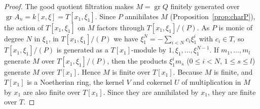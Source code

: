 \documentclass[pdflatex,sn-mathphys-num]{sn-jnl}
\numberwithin{equation}{section}
\theoremstyle{thmstyleone}
\theoremstyle{thmstyletwo}
\begin{document}
\begin{proof}
The good quotient filtration makes $M = \operatorname{gr} Q$ finitely generated over $\operatorname{gr} A_n = k[x,\xi] = T[{x_1}, \xi_1]$.
Since $P$ annihilates $M$ (Proposition~\ref{prop:charP}), the action of
$T[x_1,\xi_1]$ on $M$ factors through $T[x_1,\xi_1]/(P)$. As $P$ is monic of
degree $N$ in $\xi_1$, in $T[x_1,\xi_1]/(P)$ we have $\xi_1^N=-\sum_{i<N}c_i\xi_1^i$ with
$c_i\in T$, so $T[x_1,\xi_1]/(P)$ is generated as a $T[x_1]$-module by $1,\xi_1,\dots,\xi_1^{N-1}$.
If $m_1,\dots,m_l$ generate $M$ over $T[x_1,\xi_1]/(P)$, then the products $\xi_1^im_s$
($0\le i<N$, $1\le s\le l$) generate $M$ over $T[x_1]$. Hence $M$ is finite over
$T[x_1]$.
Because $M$ is finite, and $T[{x_1}]$ is a Noetherian ring, the kernel $V$ and cokernel $U$ of multiplication in $M$ by ${x_1}$ are also finite over $T[{x_1}]$. Since they are annihilated by ${x_1}$, they are finite over $T$. %


\end{proof}
\end{document}
